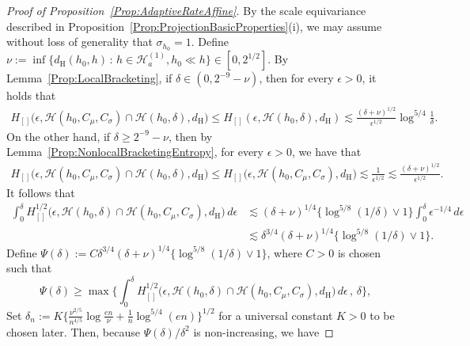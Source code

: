 \documentclass[a4paper,12pt]{article}
\begin{document}
\begin{proof}[Proof of Proposition~\ref{Prop:AdaptiveRateAffine}]
By the scale equivariance described in Proposition~\ref{Prop:ProjectionBasicProperties}(i), we may assume without loss of generality that $\sigma_{h_0} = 1$.  Define $\nu := \inf \bigl\{ d_{\mathrm{H}}(h_0, h) \,:\, h \in \mathcal{H}_{a}^{(1)}, h_0 \ll h \bigr\} \in [0,2^{1/2}]$. By Lemma~\ref{Prop:LocalBracketing}, if $\delta \in (0, 2^{-9}-\nu)$, then for every $\epsilon > 0$, it holds that 
\begin{align*}
  H_{[]}\bigl(\epsilon, \mathcal{H}(h_0, C_\mu, C_\sigma) \cap \mathcal{H}(h_0, \delta), d_{\mathrm{H}}\bigr) 
  \leq  H_{[]}(\epsilon, \mathcal{H}(h_0, \delta), d_{\mathrm{H}}) \lesssim \frac{(\delta + \nu)^{1/2}}{\epsilon^{1/2}} \log^{5/4} \frac{1}{\delta}.
\end{align*}
On the other hand, if $\delta \geq 2^{-9} - \nu$, then by Lemma~\ref{Prop:NonlocalBracketingEntropy}, for every $\epsilon > 0$, we have that 
\begin{align*}
    H_{[]}\bigl(\epsilon, \mathcal{H}(h_0, C_\mu, C_\sigma) \cap \mathcal{H}(h_0, \delta), d_{\mathrm{H}}\bigr) \leq  H_{[]}\bigl(\epsilon, \mathcal{H}(h_0, C_\mu, C_\sigma), d_{\mathrm{H}}\bigr) \lesssim \frac{1}{\epsilon^{1/2}} \lesssim \frac{(\delta + \nu)^{1/2}}{\epsilon^{1/2}}.
\end{align*}
It follows that 
\begin{align*}
  \int_0^\delta H_{[]}^{1/2}\bigl(\epsilon, \mathcal{H}(h_0, \delta) \cap
    \mathcal{H}(h_0, C_\mu, C_\sigma), d_{\mathrm{H}}\bigr) \, d\epsilon &\lesssim (\delta+\nu)^{1/4}
    \bigl\{ \log^{5/8} (1/\delta) \vee 1 \bigr\}
    \int_0^{\delta} \epsilon^{-1/4} \, d\epsilon \\
  &\lesssim \delta^{3/4} (\delta+\nu)^{1/4} \bigl\{ \log^{5/8} (1/\delta) \vee 1 \bigr\}.
\end{align*}
Define $\Psi(\delta) :=  C \delta^{3/4} (\delta+\nu)^{1/4}\{ \log^{5/8} (1/\delta) \vee 1\}$, where $C > 0$ is chosen such that 
\[
\Psi(\delta) \geq \max\biggl\{\int_0^\delta H_{[]}^{1/2}\bigl(\epsilon, \mathcal{H}(h_0, \delta) \cap
    \mathcal{H}(h_0, C_\mu, C_\sigma), d_{\mathrm{H}}\bigr) \, d\epsilon \, , \, \delta\biggr\},
\]
Set $\delta_n := K\bigl\{\frac{\nu^{2/5}}{n^{4/5}} \log \frac{en}{\nu} + \frac{1}{n} \log^{5/4}(en)\bigr\}^{1/2}$ for a universal constant $K > 0$ to be chosen later.  Then, because $\Psi(\delta)/\delta^2$ is non-increasing, we have

\end{proof}
\end{document}
